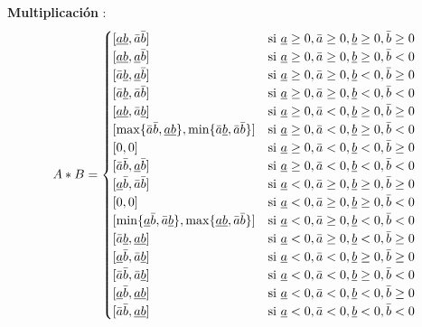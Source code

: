 \documentclass{article}
\begin{document}
\newpage

\begin{flushleft}
\textbf{Multiplicación }: \\

    \[
    A * B =
    \begin{cases}
    [\uline{ab}, \bar{a}\bar{b}] & \text{si } \uline{a} \geq 0, \bar{a} \geq 0, \uline{b} \geq 0, \bar{b} \geq 0 \\
    [\uline{ab}, \uline{a}\bar{b}] & \text{si } \uline{a} \geq 0, \bar{a} \geq 0, \uline{b} \geq 0, \bar{b} < 0 \\
    [\bar{a}\uline{b}, \uline{a}\bar{b}] & \text{si } \uline{a} \geq 0, \bar{a} \geq 0, \uline{b} < 0, \bar{b} \geq 0 \\
    [\bar{a}\uline{b}, \bar{a}\bar{b}] & \text{si } \uline{a} \geq 0, \bar{a} \geq 0, \uline{b} < 0, \bar{b} < 0 \\
    [\uline{ab}, \bar{a}\uline{b}] & \text{si } \uline{a} \geq 0, \bar{a} < 0, \uline{b} \geq 0, \bar{b} \geq 0 \\
    [\max\{\bar{a}\bar{b}, \uline{ab}\}, \min\{\bar{a}\uline{b}, \bar{a}\bar{b}\}] & \text{si } \uline{a} \geq 0, \bar{a} < 0, \uline{b} \geq 0, \bar{b} < 0 \\
    [0, 0] & \text{si } \uline{a} \geq 0, \bar{a} < 0, \uline{b} < 0, \bar{b} \geq 0 \\
    [\bar{a}\bar{b}, \uline{a}\bar{b}] & \text{si } \uline{a} \geq 0, \bar{a} < 0, \uline{b} < 0, \bar{b} < 0 \\
    [\uline{a}\bar{b}, \bar{a}\bar{b}] & \text{si } \uline{a} < 0, \bar{a} \geq 0, \uline{b} \geq 0, \bar{b} \geq 0 \\
    [0, 0] & \text{si } \uline{a} < 0, \bar{a} \geq 0, \uline{b} \geq 0, \bar{b} < 0 \\
    [\min\{\uline{a}\bar{b}, \bar{a}\uline{b}\}, \max\{\uline{ab}, \bar{a}\bar{b}\}] & \text{si } \uline{a} < 0, \bar{a} \geq 0, \uline{b} < 0, \bar{b} < 0 \\
    [\bar{a}\uline{b}, \uline{ab}] & \text{si } \uline{a} < 0, \bar{a} \geq 0, \uline{b} < 0, \bar{b} \geq 0 \\
    [\uline{a}\bar{b}, \bar{a}\uline{b}] & \text{si } \uline{a} < 0, \bar{a} < 0, \uline{b} \geq 0, \bar{b} \geq 0 \\
    [\bar{a}\bar{b}, \bar{a}\uline{b}] & \text{si } \uline{a} < 0, \bar{a} < 0, \uline{b} \geq 0, \bar{b} < 0 \\
    [\uline{a}\bar{b}, \uline{ab}] & \text{si } \uline{a} < 0, \bar{a} < 0, \uline{b} < 0, \bar{b} \geq 0 \\
    [\bar{a}\bar{b}, \uline{ab}] & \text{si } \uline{a} < 0, \bar{a} < 0, \uline{b} < 0, \bar{b} < 0
    \end{cases}
    \]

\end{flushleft}
\end{document}
